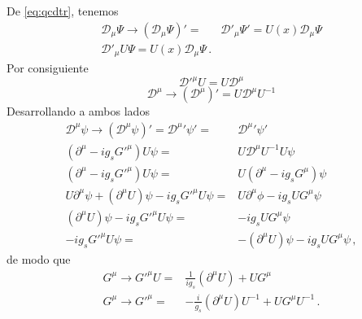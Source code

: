 De \eqref{eq:qcdtr}, tenemos
\begin{align}
   \mathcal{D}_\mu\Psi\to \left(\mathcal{D}_\mu\Psi\right)'=&\mathcal{D}'_\mu\Psi'
  =U(x)\mathcal{D}_\mu\Psi\nonumber\\
\mathcal{D}'_\mu U\Psi
  =U(x)\mathcal{D}_\mu\Psi\,.
\end{align}
Por consiguiente
\begin{equation}
  {\mathcal{D}'}^\mu U=U\mathcal{D}^\mu
\end{equation}
\begin{equation}
  \mathcal{D}^\mu\to\left(
    \mathcal{D}^\mu
  \right)'=U\mathcal{D}^\mu U^{-1}
\end{equation}
Desarrollando a ambos lados
\begin{align}
  \label{eq:251qft}
   {\mathcal{D}}^\mu\psi\to{\left({\mathcal{D}}^\mu\psi\right)}'=
  {\mathcal{D}^\mu}'\psi'=&{\mathcal{D}^\mu}'\psi'\nonumber\\
  (\partial^\mu-i g_s {G'}^\mu) U\psi=&U\mathcal{D}^\mu U^{-1}U\psi\nonumber\\
  (\partial^\mu-i g_s {G'}^\mu) U\psi=&U(\partial^\mu-i g_s {G}^\mu)\psi\nonumber\\
  U\partial^\mu\psi+(\partial^\mu U)\psi-i g_s {G'}^\mu U \psi=&U\partial^\mu\phi-i g_s U {G}^\mu \psi\nonumber\\
  (\partial^\mu U)\psi-i g_s {G'}^\mu U \psi=&-i g_s U {G}^\mu \psi\nonumber\\
  -i g_s {G'}^\mu U \psi=&-(\partial^\mu U)\psi-i g_s U {G}^\mu \psi\,,
\end{align}
de modo que
\begin{align}
 G^{\mu}\to     {G'}^\mu U =&\frac{1}{i g_s}(\partial^\mu U)+ U{G}^\mu \nonumber\\
 G^{\mu}\to  {G'}^\mu  =&-\frac{i}{g_s}(\partial^\mu U)U^{-1}+ U{G}^\mu U^{-1}\,.
\end{align}
